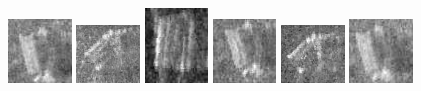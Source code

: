 \begin{figure}
    \includegraphics[width=0.15\textwidth]{chapters/images/dataset/all-class-images/can/can-254.jpg}
    \includegraphics[width=0.15\textwidth]{chapters/images/dataset/all-class-images/can/can-47.jpg}
    \includegraphics[width=0.15\textwidth]{chapters/images/dataset/all-class-images/can/can-173.jpg}
    \includegraphics[width=0.15\textwidth]{chapters/images/dataset/all-class-images/can/can-227.jpg}
    \includegraphics[width=0.15\textwidth]{chapters/images/dataset/all-class-images/can/can-16.jpg}
    \includegraphics[width=0.15\textwidth]{chapters/images/dataset/all-class-images/can/can-262.jpg}
    

\end{figure}

